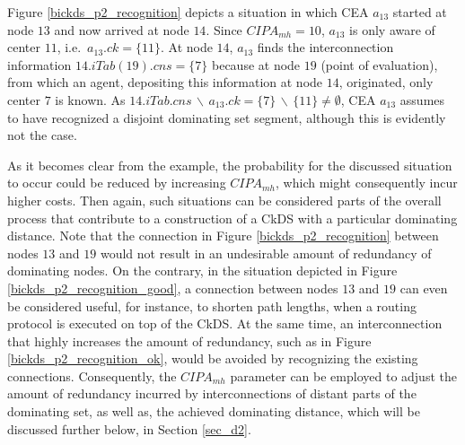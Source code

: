 \exampleBegin

Figure \ref{bickds_p2_recognition} depicts a situation in which CEA $a_{13}$ started at node $13$ and now arrived at node $14$. Since $CIPA_{mh}=10$, $a_{13}$ is only aware of center $11$, i.e.\ $a_{13}.ck=\{11\}$. At node $14$, $a_{13}$ finds the interconnection information $14.iTab(19).cns=\{7\}$ because at node $19$ (point of evaluation), from which an agent, depositing this information at node $14$, originated, only center $7$ is known. As $14.iTab.cns \,\backslash\, a_{13}.ck=\{7\} \,\backslash\, \{ 11\}\neq \emptyset$, CEA $a_{13}$ assumes to have recognized a disjoint dominating set segment, although this is evidently not the case.

\exampleEnd



As it becomes clear from the example, the probability for the discussed situation to occur could be reduced by increasing $CIPA_{mh}$, which might consequently incur higher costs. Then again, such situations can be considered parts of the overall process that contribute to a construction of a CkDS with a particular dominating distance. Note that the connection in Figure \ref{bickds_p2_recognition} between nodes $13$ and $19$ would not result in an undesirable amount of redundancy of dominating nodes. On the contrary, in the situation depicted in Figure \ref{bickds_p2_recognition_good}, a connection between nodes $13$ and $19$ can even be considered useful, for instance, to shorten path lengths, when a routing protocol is executed on top of the CkDS. At the same time, an interconnection that highly increases the amount of redundancy, such as in Figure \ref{bickds_p2_recognition_ok}, would be avoided by recognizing the existing connections. Consequently, the $CIPA_{mh}$ parameter can be employed to adjust the amount of redundancy incurred by interconnections of distant parts of the dominating set, as well as, the achieved dominating distance, which will be discussed further below, in Section \ref{sec_d2}.






